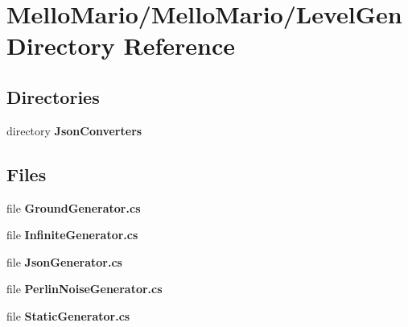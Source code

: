 \section{Mello\+Mario/\+Mello\+Mario/\+Level\+Gen Directory Reference}
\label{dir_c142edaef9a4d41c561ca332f7d3afd6}
\subsection*{Directories}
\begin{DoxyCompactItemize}
\item 
directory \textbf{ Json\+Converters}
\end{DoxyCompactItemize}
\subsection*{Files}
\begin{DoxyCompactItemize}
\item 
file \textbf{ Ground\+Generator.\+cs}
\item 
file \textbf{ Infinite\+Generator.\+cs}
\item 
file \textbf{ Json\+Generator.\+cs}
\item 
file \textbf{ Perlin\+Noise\+Generator.\+cs}
\item 
file \textbf{ Static\+Generator.\+cs}
\end{DoxyCompactItemize}
